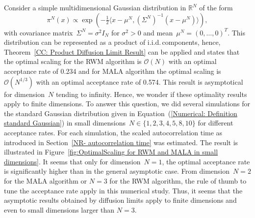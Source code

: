 Consider a simple multidimensional Gaussian distribution in $\mathbb{R}^N$  of the form
\begin{equation}
 \label{Numerical: Definition standard Gaussian}
 \pi^N (x) \varpropto \exp \left( -\tfrac{1}{2} \langle x - \mu^N, (\Sigma^N)^{-1} (x-\mu^N) \rangle  \right),
\end{equation}
with covariance matrix~$\Sigma^N = \sigma^2 I_N$ for $\sigma^2 >0$ and mean~$\mu^N = (0, \dots, 0)^T$. This distribution can be represented as a product of i.i.d.\,components, hence, Theorem~\ref{CC: Product Diffusion Limit Result} can be applied and states that the optimal scaling for the RWM algorithm is $\mathcal{O}(N)$ with an optimal acceptance rate of 0.234 and for MALA algorithm the optimal scaling is $\mathcal{O}(N^{1/3})$ with an optimal acceptance rate of 0.574. This result is asymptotical for dimension~$N$ tending to infinity. Hence, we wonder if these optimality results apply to finite dimensions. To answer this question, we did several simulations for the standard Gaussian distribution given in Equation~(\ref{Numerical: Definition standard Gaussian}) in small dimensions~$N \in \{ 1,2,3,4,5,8,10 \}$ for different acceptance rates. For each simulation, the scaled autocorrelation time as introduced in Section~\ref{NR- autocorrelation time} was estimated. The result is illustrated in Figure~\ref{fig:OptimalScaling for RWM and MALA in small dimensions}. It seems that only for dimension~$N=1$, the optimal acceptance rate is significantly higher than in the general asymptotic case. From dimension~$N=2$ for the MALA algorithm or $N=3$ for the RWM algorithm, the rule of thumb to tune the acceptance rate apply in this numerical study. Thus, it seems that the asymptotic results obtained by diffusion limits apply to finite dimensions and even to small dimensions larger than $N=3$. 

